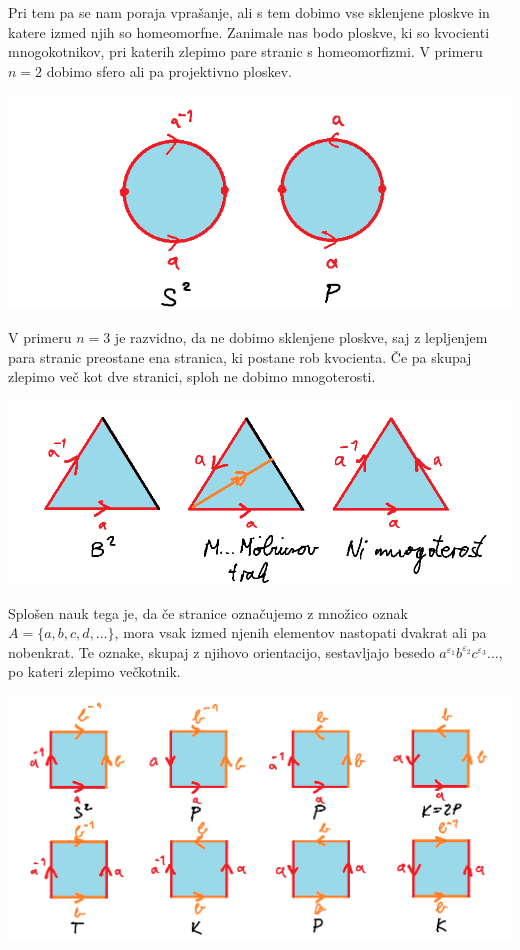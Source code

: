 \documentclass[10pt, a4paper]{article}
\begin{document}
Pri tem pa se nam poraja vprašanje, ali s tem dobimo vse sklenjene ploskve in katere izmed njih 
so homeomorfne. Zanimale nas bodo ploskve, ki so kvocienti mnogokotnikov, pri katerih zlepimo 
pare stranic s homeomorfizmi. V primeru $n = 2$ dobimo sfero ali pa projektivno ploskev.
\begin{center}
  \includegraphics[scale=0.7]{ploskve1.png}
\end{center}
V primeru $n = 3$ je razvidno, da ne dobimo sklenjene ploskve, 
saj z lepljenjem para stranic preostane ena stranica, ki postane rob kvocienta.
Če pa skupaj zlepimo več kot dve stranici, sploh ne dobimo mnogoterosti.
\begin{center}
  \includegraphics[scale=0.6]{ploskve2.png}
\end{center}
Splošen nauk tega je, da če stranice označujemo 
z množico oznak $A = \{a, b, c, d, \dots\}$, mora vsak 
izmed njenih elementov nastopati dvakrat ali pa nobenkrat.
Te oznake, skupaj z njihovo orientacijo, sestavljajo besedo 
$a^{\varepsilon_1} b^{\varepsilon_2} c^{\varepsilon_3} \dots$,
po kateri zlepimo večkotnik.

\begin{center}
  \includegraphics[scale=0.50]{ploskve3.png}
\end{center}
\end{document}
